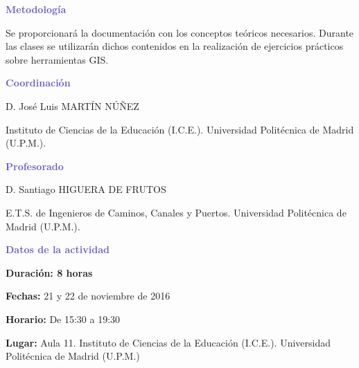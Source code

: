 \documentclass[10pt, oneside]{article}
\begin{document}
\vspace{1em}
\hspace*{-2em}\textbf{\textcolor{SlateBlue}{Metodología}}

Se proporcionará la documentación con los conceptos teóricos necesarios. Durante las clases se utilizarán dichos contenidos en la realización de ejercicios prácticos sobre herramientas GIS.

\hspace*{-2em}\textbf{\textcolor{SlateBlue}{Coordinación}}

D. José Luis MARTÍN NÚÑEZ

\hspace{1em}Instituto de Ciencias de la Educación (I.C.E.). Universidad Politécnica de Madrid (U.P.M.).

\hspace*{-2em}\textbf{\textcolor{SlateBlue}{Profesorado}}

D. Santiago HIGUERA DE FRUTOS

\hspace{1em}E.T.S. de Ingenieros de Caminos, Canales y Puertos. Universidad Politécnica de Madrid (U.P.M.).

\vspace{1em}
\hspace*{-2em}\textbf{\textcolor{SlateBlue}{Datos de la actividad}}

\textbf{Duración: 8 horas} 

\textbf{Fechas:} 21 y 22 de noviembre de 2016

\textbf{Horario:} De 15:30 a 19:30

\textbf{Lugar:} Aula 11. Instituto de Ciencias de la Educación (I.C.E.). Universidad Politécnica de Madrid (U.P.M.)
\end{document}
